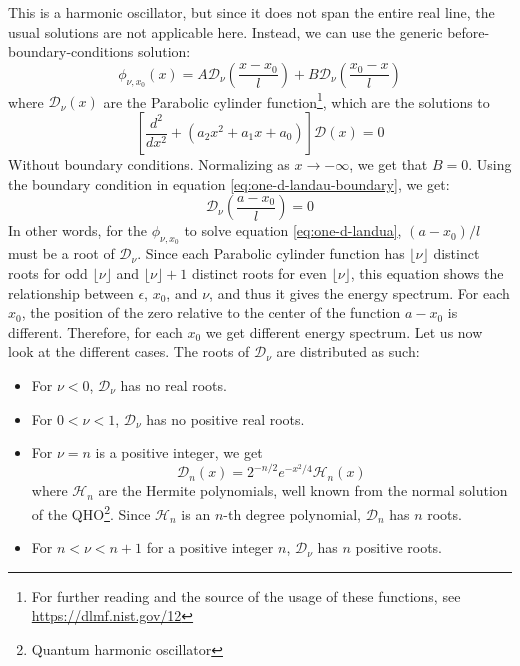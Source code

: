 \documentclass{article}
\begin{document}
This is a harmonic oscillator, but since it does not span the entire real line, the usual solutions are not applicable here. Instead, we can use the generic before-boundary-conditions solution:
\begin{equation}
    \phi_{\nu,x_0}(x) = A \mathcal{D}_\nu\left(\frac{x - x_0}{l}\right) + B \mathcal{D}_\nu\left(\frac{x_0 - x}{l}\right)
\end{equation}
where $\mathcal{D}_\nu(x)$ are the Parabolic cylinder function\footnote{For further reading and the source of the usage of these functions, see \url{https://dlmf.nist.gov/12}}, which are the solutions to
\begin{equation}
    \left[\frac{d^2}{dx^2} + (a_2x^2 + a_1x + a_0)\right]\mathcal{D}(x) = 0
\end{equation}
Without boundary conditions. Normalizing as $x \rightarrow -\infty$, we get that $B = 0$. Using the boundary condition in equation \ref{eq:one-d-landau-boundary}, we get:
\begin{equation}
    \mathcal{D}_\nu\left(\frac{a - x_0}{l}\right) = 0
\end{equation}
In other words, for the $\phi_{\nu, x_0}$ to solve equation \ref{eq:one-d-landua}, $(a - x_0)/l$ must be a root of $\mathcal{D}_\nu$. Since each Parabolic cylinder function has $\lfloor\nu\rfloor$ distinct roots for odd $\lfloor\nu\rfloor$ and $\lfloor\nu\rfloor + 1$ distinct roots for even $\lfloor\nu\rfloor$, this equation shows the relationship between $\epsilon$, $x_0$, and $\nu$, and thus it gives the energy spectrum. For each $x_0$, the position of the zero relative to the center of the function $a - x_0$ is different. Therefore, for each $x_0$ we get different energy spectrum.
\newline
Let us now look at the different cases. The roots of $\mathcal{D}_\nu$ are distributed as such:
\begin{itemize}
    \item For $\nu < 0$, $\mathcal{D}_\nu$ has no real roots.
    \item For $0 < \nu < 1$, $\mathcal{D}_\nu$ has no positive real roots.
    \item For $\nu = n$ is a positive integer, we get
    \begin{equation}
        \mathcal{D}_n(x) = 2^{-n/2}e^{-x^2/4}\mathcal{H}_n(x)
    \end{equation}
    where $\mathcal{H}_n$ are the Hermite polynomials, well known from the normal solution of the QHO\footnote{Quantum harmonic oscillator}. Since $\mathcal{H}_n$ is an $n$-th degree polynomial, $\mathcal{D}_n$ has $n$ roots.
    \item For $n < \nu < n+1$ for a positive integer $n$, $\mathcal{D}_\nu$ has $n$ positive roots.
\end{itemize}
\end{document}
